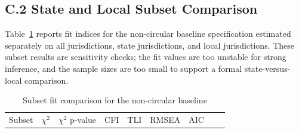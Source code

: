 \documentclass[
  number]{elsarticle}
\begin{document}
\subsection{C.2 State and Local Subset
Comparison}\label{c.2-state-and-local-subset-comparison}

Table~\ref{tbl-subset-comparison} reports fit indices for the
non-circular baseline specification estimated separately on all
jurisdictions, state jurisdictions, and local jurisdictions. These
subset results are sensitivity checks; the fit values are too unstable
for strong inference, and the sample sizes are too small to support a
formal state-versus-local comparison.

\begin{longtable}[]{@{}
  >{\raggedright\arraybackslash}p{}
  >{\raggedleft\arraybackslash}p{}
  >{\raggedleft\arraybackslash}p{}
  >{\raggedleft\arraybackslash}p{}
  >{\raggedleft\arraybackslash}p{}
  >{\raggedleft\arraybackslash}p{}
  >{\raggedleft\arraybackslash}p{}
  >{\raggedleft\arraybackslash}p{}
  >{\raggedleft\arraybackslash}p{}@{}}
\caption{Subset fit comparison for the non-circular
baseline}\label{tbl-subset-comparison}\tabularnewline
\toprule\noalign{}
\begin{minipage}[b]{\linewidth}\raggedright
Subset
\end{minipage} & \begin{minipage}[b]{\linewidth}\raggedleft
\(\chi^2\)
\end{minipage} & \begin{minipage}[b]{\linewidth}\raggedleft
\(\chi^2\) p-value
\end{minipage} & \begin{minipage}[b]{\linewidth}\raggedleft
CFI
\end{minipage} & \begin{minipage}[b]{\linewidth}\raggedleft
TLI
\end{minipage} & \begin{minipage}[b]{\linewidth}\raggedleft
RMSEA
\end{minipage} & \begin{minipage}[b]{\linewidth}\raggedleft
AIC
\end{minipage} & \begin{minipage}[b]{\linewidth}\raggedleft

\end{minipage}
\end{longtable}
\end{document}
